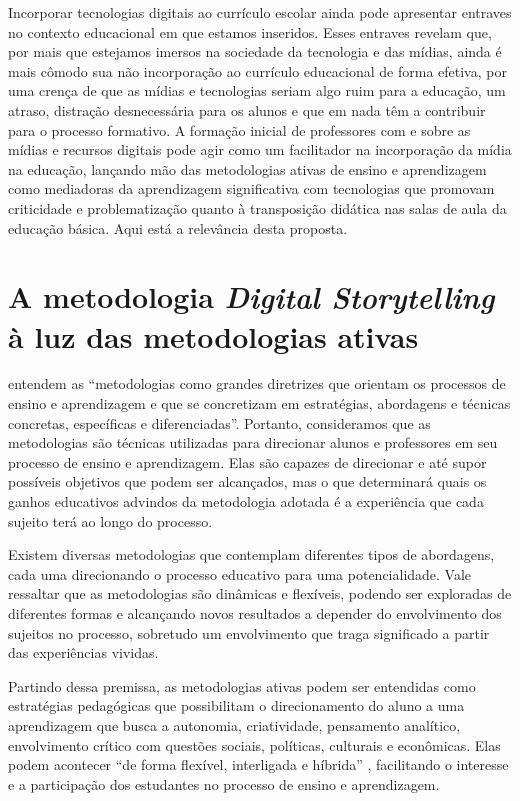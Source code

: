 \documentclass[portuguese]{textolivre}
\begin{document}
Incorporar tecnologias digitais ao currículo escolar ainda pode apresentar entraves no contexto educacional em que estamos inseridos. Esses entraves revelam que, por mais que estejamos imersos na sociedade da tecnologia e das mídias, ainda é mais cômodo sua não incorporação ao currículo educacional de forma efetiva, por uma crença de que as mídias e tecnologias seriam algo ruim para a educação, um atraso, distração desnecessária para os alunos e que em nada têm a contribuir para o processo formativo. A formação inicial de professores com e sobre as mídias e recursos digitais pode agir como um facilitador na incorporação da mídia na educação, lançando mão das metodologias ativas de ensino e aprendizagem como mediadoras da aprendizagem significativa com tecnologias que promovam criticidade e problematização quanto à transposição didática nas salas de aula da educação básica. Aqui está a relevância desta proposta.

\section{A metodologia \textit{Digital Storytelling} à luz das metodologias ativas}\label{sec-normas}
\textcite[p.~41]{bacich2018metodologias} entendem as “metodologias como grandes diretrizes que orientam os processos de ensino e aprendizagem e que se concretizam em estratégias, abordagens e técnicas concretas, específicas e diferenciadas”. Portanto, consideramos que as metodologias são técnicas utilizadas para direcionar alunos e professores em seu processo de ensino e aprendizagem. Elas são capazes de direcionar e até supor possíveis objetivos que podem ser alcançados, mas o que determinará quais os ganhos educativos advindos da metodologia adotada é a experiência que cada sujeito terá ao longo do processo.

Existem diversas metodologias que contemplam diferentes tipos de abordagens, cada uma direcionando o processo educativo para uma potencialidade. Vale ressaltar que as metodologias são dinâmicas e flexíveis, podendo ser exploradas de diferentes formas e alcançando novos resultados a depender do envolvimento dos sujeitos no processo, sobretudo um envolvimento que traga significado a partir das experiências vividas.

Partindo dessa premissa, as metodologias ativas podem ser entendidas como estratégias pedagógicas que possibilitam o direcionamento do aluno a uma aprendizagem que busca a autonomia, criatividade, pensamento analítico, envolvimento crítico com questões sociais, políticas, culturais e econômicas. Elas podem acontecer “de forma flexível, interligada e híbrida” \cite[p.~41]{bacich2018metodologias}, facilitando o interesse e a participação dos estudantes no processo de ensino e aprendizagem.
\end{document}
